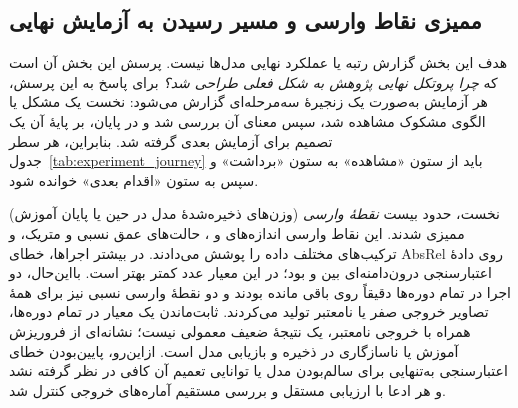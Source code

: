 \subsection{ممیزی نقاط وارسی و مسیر رسیدن به آزمایش نهایی}
\label{subsec:checkpoint_audit}

هدف این بخش گزارش رتبه یا عملکرد نهایی مدل‌ها نیست. پرسش این بخش آن است که
\emph{چرا پروتکل نهایی پژوهش به شکل فعلی طراحی شد؟} برای پاسخ به این پرسش، هر
آزمایش به‌صورت یک زنجیرهٔ سه‌مرحله‌ای گزارش می‌شود: نخست یک مشکل یا الگوی مشکوک
مشاهده شد، سپس معنای آن بررسی شد و در پایان، بر پایهٔ آن یک تصمیم برای آزمایش
بعدی گرفته شد. بنابراین، هر سطر جدول~\ref{tab:experiment_journey} باید از ستون
«مشاهده» به ستون «برداشت» و سپس به ستون «اقدام بعدی» خوانده شود.

نخست، حدود بیست \emph{نقطهٔ وارسی} (وزن‌های ذخیره‌شدهٔ مدل در حین یا پایان
آموزش) ممیزی شدند. این نقاط وارسی اندازه‌های  و ، حالت‌های
عمق نسبی و متریک، و ترکیب‌های مختلف داده را پوشش می‌دادند. در بیشتر اجراها، خطای
AbsRel روی دادهٔ اعتبارسنجی درون‌دامنه‌ای بین  و  بود؛ در این معیار عدد
کمتر بهتر است. بااین‌حال، دو اجرا در تمام دوره‌ها دقیقاً روی  باقی مانده
بودند و دو نقطهٔ وارسی نسبی  نیز برای همهٔ تصاویر خروجی صفر یا نامعتبر
تولید می‌کردند. ثابت‌ماندن یک معیار در تمام دوره‌ها، همراه با خروجی نامعتبر، یک
نتیجهٔ ضعیف معمولی نیست؛ نشانه‌ای از فروریزش آموزش یا ناسازگاری در ذخیره و
بازیابی مدل است. ازاین‌رو، پایین‌بودن خطای اعتبارسنجی به‌تنهایی برای سالم‌بودن
مدل یا توانایی تعمیم آن کافی در نظر گرفته نشد و هر ادعا با ارزیابی مستقل و
بررسی مستقیم آماره‌های خروجی کنترل شد.

